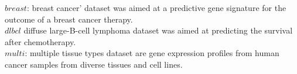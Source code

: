 \begin{table}[!t]
\centering
   \caption{Description of Real Gene Datasets and the Mean No. of Biclusters returned by each Algorithm}
    \label{tab:description of real gene }
\begin{tablenotes}
		\tiny
		\item ${breast}$: breast cancer’ dataset was aimed at a predictive gene signature for the outcome of a breast cancer therapy.\\
		${dlbcl}$ diffuse large-B-cell lymphoma dataset was aimed at predicting the survival after chemotherapy.\\
	    ${multi}$: multiple tissue types dataset are gene expression profiles from human cancer samples from diverse tissues
and cell lines.
	\end{tablenotes}
\end{table}
